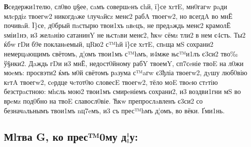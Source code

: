 \textbf{В}седержи1телю, сл0во џ§ее, сaмъ совершeнъ сhй, ї\}се хrтE, мн0гагw рaди
млcрдіz твоегw2 никогдaже tлучaйсz менє2 рабA твоегw2, но всегдA во мнЁ
почивaй. Ї\}се, д0брый пaстырю твои1хъ nвeцъ, не предaждь менє2 крамолЁ
ѕміи1нэ, и3 желaнію сатанинY не њстaви менє2, ћкw сёмz тли2 в нем є4сть.
Ты2 ќбw гDи б9е покланsемый, цRю2 с™hй ї\}се хrтE, спsща мS сохрани2
немерцaющимъ свётомъ, д¦омъ твои1мъ с™hмъ, и4мже њс™и1лъ є3си2 тво‰
ў§нки2. Дaждь гDи и3 мнЁ, недост0йному рабY твоемY, сп7сeніе твоE на
л0жи моeмъ: просвэти2 ќмъ м0й свётомъ рaзума с™aгw є3ђліа твоегw2, дyшу
люб0вію кrтA твоегw2, сeрдце чcтот0ю словесE твоегw2, тёло моE твоeю
стrтію безстрaстною: мhсль мою2 твои1мъ смирeніемъ сохрани2, и3
воздви1гни мS во врeмz под0бно на твоE славосл0віе. Ћкw препрослaвленъ
є3си2 со безначaльнымъ твои1мъ nц7eмъ, и3 съ прес™hмъ д¦омъ, во вёки.
Ґми1нь.

\subsection[Молитва 3, ко Пресвятому Духу]
{Мlтва G, ко прес™0му д¦у:}

